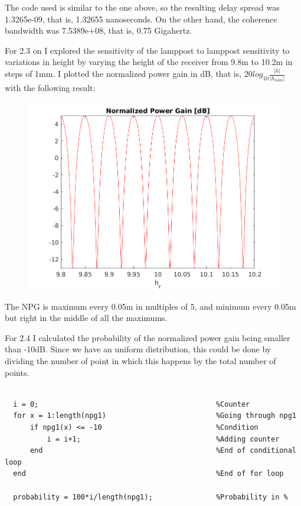 \documentclass[a4paper,11pt]{article}
\begin{document}
The code used is similar to the one above, so the resulting delay spread was
1.3265e-09, that is, 1.32655 nanoseconds. On the other hand, the coherence
bandwidth was 7.5389e+08, that is, 0.75 Gigahertz.

\bigskip

For 2.3 on I explored the sensitivity of the lamppost to lamppost sensitivity to
variations in height by varying the height of the receiver from 9.8m to 10.2m
in steps of 1mm. I plotted the normalized power gain in dB, that is,
$20log_{10}\displaystyle\frac{|h|}{|h_{nom}|}$ with the following result:

\begin{figure}[!ht]
	\centering
	\includegraphics[scale = 1]{images/2_3.png}
\end{figure}

The NPG is maximum every 0.05m in multiples of 5, and minimum every 0.05m but
right in the middle of all the maximums.

\newpage

For 2.4 I calculated the probability of the normalized power gain being smaller
than -10dB. Since we have an uniform distribution, this could be done by
dividing the number of point in which this happens by the total number of points.

\bigskip

\begin{lstlisting}

  i = 0;                                          %Counter
  for x = 1:length(npg1)                          %Going through npg1
      if npg1(x) <= -10                           %Condition
          i = i+1;                                %Adding counter
      end                                         %End of conditional loop
  end                                             %End of for loop

  probability = 100*i/length(npg1);               %Probability in %

\end{lstlisting}
\end{document}
